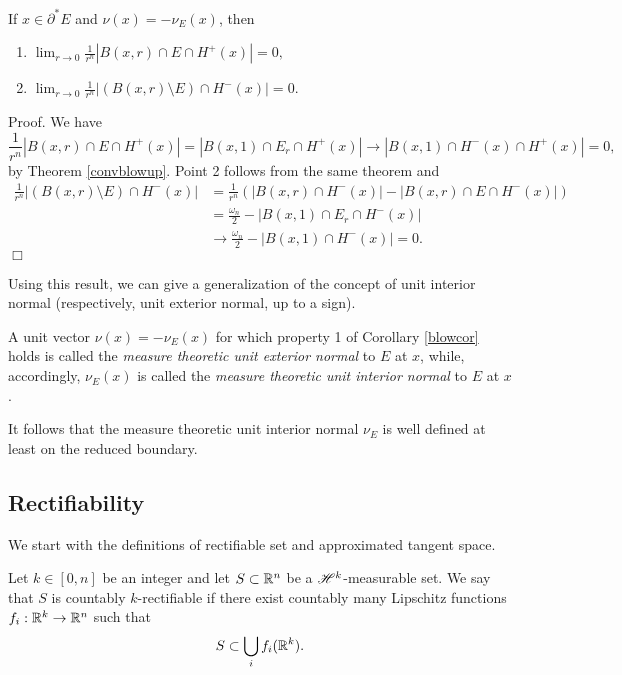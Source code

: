 \begin{corollary} \label{blowcor} If $x \in \partial^{*}E$ and $\nu(x) = - \nu_{E}(x)$, then
\begin{enumerate}
	\item $\displaystyle \lim_{r \to 0} \frac{1}{r^{n}} |B(x,r) \cap E \cap H^{+}(x)| = 0,$
	\item $\displaystyle \lim_{r \to 0} \frac{1}{r^{n}} |(B(x,r) \setminus E) \cap H^{-}(x)| = 0.$
\end{enumerate}
\end{corollary}
Proof. We have 
\[\frac{1}{r^{n}} |B(x,r) \cap E \cap H^{+}(x)| = |B(x,1) \cap E_{r} \cap H^{+}(x)| \to |B(x,1) \cap H^{-}(x) \cap H^{+}(x)| = 0,\]
by Theorem \ref{convblowup}. Point 2 follows from the same theorem and 
\begin{align*} \frac{1}{r^{n}} |(B(x,r) \setminus E) \cap H^{-}(x)| & = \frac{1}{r^{n}} ( |B(x,r) \cap H^{-}(x)| - |B(x,r) \cap E \cap H^{-}(x)|) \\
& = \frac{\omega_{n}}{2} - |B(x,1) \cap E_{r} \cap H^{-}(x)| \\
& \to \frac{\omega_{n}}{2} - |B(x,1) \cap H^{-}(x)| = 0. \end{align*}
\hfill $\Box$

Using this result, we can give a generalization of the concept of unit interior normal (respectively, unit exterior normal, up to a sign).

\begin{definition} A unit vector $\nu(x) = - \nu_{E}(x)$ for which property 1 of Corollary \ref{blowcor} holds is called the {\em measure theoretic unit exterior normal} to $E$ at $x$, while, accordingly, $\nu_{E}(x)$ is called the {\em measure theoretic unit interior normal} to $E$ at $x$.
\end{definition}

It follows that the measure theoretic unit interior normal $\nu_{E}$ is well defined at least on the reduced boundary. 


\subsection{Rectifiability}

We start with the definitions of rectifiable set and approximated tangent space.

\begin{definition}
Let $k \in [0, n]$ be an integer and let $S \subset \mathbb{R}^{n}$ be a $\mathscr{H}^{k}$-measurable set. We say that $S$ is countably $k$-rectifiable if there exist countably many Lipschitz functions $f_{i} : \mathbb{R}^{k} \to \mathbb{R}^{n}$ such that 
\begin{equation*}
S \subset \bigcup_{i} f_{i}(\mathbb{R}^{k}).
\end{equation*}
\end{definition}

